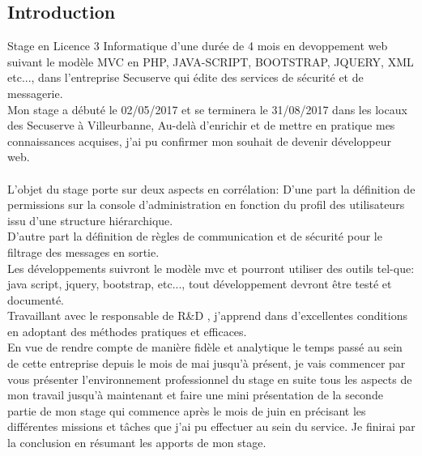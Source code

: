 

\begin{center}
\section{Introduction}
\end{center}
\begin{spacing}{1.3}
Stage en Licence 3 Informatique d’une durée de 4 mois en devoppement web suivant le modèle MVC en PHP, JAVA-SCRIPT, BOOTSTRAP, JQUERY, XML etc..., dans l'entreprise Secuserve qui édite des services de sécurité et de messagerie.\\
Mon stage a débuté le 02/05/2017 et se terminera le 31/08/2017 dans les locaux des Secuserve à Villeurbanne, Au-delà d’enrichir et de mettre en pratique mes connaissances acquises, j'ai pu confirmer mon souhait de devenir développeur web.\\ \\
L’objet du stage porte sur deux aspects en corrélation:
D'une part la définition de permissions sur la console d'administration en fonction du profil des utilisateurs issu d'une structure hiérarchique.\\
D'autre part la définition de règles de communication et de sécurité pour le filtrage des messages en sortie.\\
Les développements suivront le modèle mvc et pourront utiliser des outils tel-que: java script, jquery, bootstrap, etc..., tout développement devront être testé et documenté.\\
Travaillant avec le responsable de R\&D , j’apprend dans d’excellentes conditions en adoptant des méthodes pratiques et efficaces.  \\

En vue de rendre compte de manière fidèle et analytique le temps passé au sein de cette entreprise depuis le mois de mai jusqu'à présent, je vais commencer par vous présenter l'environnement professionnel du stage en suite tous les aspects de mon travail jusqu'à maintenant et faire une mini présentation de la seconde partie de mon stage qui commence après le mois de juin en précisant les différentes missions et tâches que j’ai pu effectuer au sein du service. Je finirai par la conclusion  en résumant les apports de mon stage.
\end{spacing}